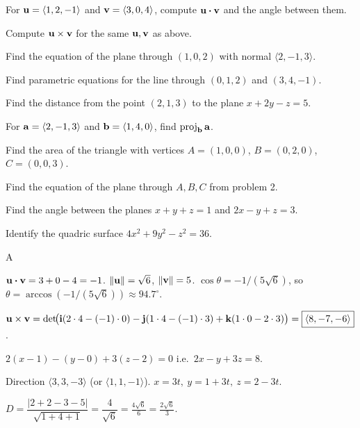 \documentclass[11pt]{article}
\begin{document}
\begin{problems}
\item For $\mathbf{u} = \langle 1, 2, -1 \rangle$ and $\mathbf{v} = \langle 3, 0, 4 \rangle$, compute $\mathbf{u} \boldsymbol\cdot \mathbf{v}$ and the angle between them.
\item Compute $\mathbf{u} \times \mathbf{v}$ for the same $\mathbf{u}, \mathbf{v}$ as above.
\item Find the equation of the plane through $(1, 0, 2)$ with normal $\langle 2, -1, 3 \rangle$.
\item Find parametric equations for the line through $(0, 1, 2)$ and $(3, 4, -1)$.
\item Find the distance from the point $(2, 1, 3)$ to the plane $x + 2y - z = 5$.
\end{problems}

\vfill
\newpage
{}
\begin{problems}
\item For $\mathbf{a} = \langle 2, -1, 3 \rangle$ and $\mathbf{b} = \langle 1, 4, 0 \rangle$, find $\operatorname{proj}_{\mathbf{b}} \mathbf{a}$.
\item Find the area of the triangle with vertices $A = (1, 0, 0)$, $B = (0, 2, 0)$, $C = (0, 0, 3)$.
\item Find the equation of the plane through $A, B, C$ from problem 2.
\item Find the angle between the planes $x + y + z = 1$ and $2x - y + z = 3$.
\item Identify the quadric surface $4x^2 + 9y^2 - z^2 = 36$.
\end{problems}

\vfill
\newpage
{}

\begin{answers}{A}
\item $\mathbf{u} \boldsymbol\cdot \mathbf{v} = 3 + 0 - 4 = -1$. $\|\mathbf{u}\| = \sqrt 6$, $\|\mathbf{v}\| = 5$. $\cos\theta = -1/(5\sqrt 6)$, so $\theta = \arccos(-1/(5\sqrt 6)) \approx \boxed{94.7^\circ}$.
\item $\mathbf{u} \times \mathbf{v} = \det\!\bigl(\mathbf{i}(2 \cdot 4 - (-1)\cdot 0) - \mathbf{j}(1 \cdot 4 - (-1)\cdot 3) + \mathbf{k}(1 \cdot 0 - 2 \cdot 3)\bigr) = \boxed{\langle 8, -7, -6 \rangle}$.
\item $\boxed{2(x - 1) - (y - 0) + 3(z - 2) = 0}$ i.e.\ $2x - y + 3z = 8$.
\item Direction $\langle 3, 3, -3 \rangle$ (or $\langle 1,1,-1\rangle$). $\boxed{x = 3t,\ y = 1 + 3t,\ z = 2 - 3t}$.
\item $D = \dfrac{|2 + 2 - 3 - 5|}{\sqrt{1 + 4 + 1}} = \dfrac{4}{\sqrt 6} = \boxed{\tfrac{4\sqrt 6}{6} = \tfrac{2\sqrt 6}{3}}$.
\end{answers}
\end{document}
